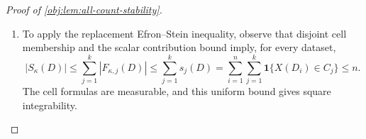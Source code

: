\begin{proof}[Proof of \cref{obj:lem:all-count-stability}]
\begin{enumerate}
The original and replacement datasets have the same erased cell tuples. Applying the preceding estimate to both gives
\[
\begin{aligned}
|F_{\kappa,j}(D)-F_{\kappa,j}(D^{(i_\star)})|
\le{}&
3\,\mathbf1\{X(D_{i_\star})\in C_j,\ B_{j,i_\star}(D)\ge1\}\\
&+3\,\mathbf1\{X(o^\star)\in C_j,\ B_{j,i_\star}(D)\ge1\}.
\end{aligned}
\]
Summing over cells and using the partner-indicator identity therefore yields
\[
|S_\kappa(D)-S_\kappa(D^{(i_\star)})|
\le3\bigl(J_{i_\star}^{\mathrm{old}}+J_{i_\star}^{\mathrm{new}}\bigr).
\]
Both indicators take values in \(\{0,1\}\). Squaring this bound and checking their four possible pairs gives
\[
\begin{aligned}
\bigl(S_\kappa(D)-S_\kappa(D^{(i_\star)})\bigr)^2
&\le9\bigl(J_{i_\star}^{\mathrm{old}}+J_{i_\star}^{\mathrm{new}}\bigr)^2\\
&\le18\bigl(J_{i_\star}^{\mathrm{old}}+J_{i_\star}^{\mathrm{new}}\bigr).
\end{aligned}
\]
For the pairs \((0,0),(1,0),(0,1),(1,1)\), the middle expression is respectively \(0,9,9,36\), while the final expression is \(0,18,18,36\).

The bounded measurable statistics and indicators make these expressions integrable. Taking expectations and applying the partner expectation from the preceding step gives, for every record position,
\[
\begin{aligned}
\mathbb E\bigl(S_N(D)-S_N(D^{(i_\star)})\bigr)^2
&\le18\,\mathbb E\bigl[J_{i_\star}^{\mathrm{old}}
+J_{i_\star}^{\mathrm{new}}\bigr]
=\frac{36W(P)}n,\\
\mathbb E\bigl(S_D(D)-S_D(D^{(i_\star)})\bigr)^2
&\le18\,\mathbb E\bigl[J_{i_\star}^{\mathrm{old}}
+J_{i_\star}^{\mathrm{new}}\bigr]
=\frac{36W(P)}n.
\end{aligned}
\]

\item To apply the replacement Efron--Stein inequality, observe that disjoint cell membership and the scalar contribution bound imply, for every dataset,
\[
|S_\kappa(D)|
\le\sum_{j=1}^k|F_{\kappa,j}(D)|
\le\sum_{j=1}^k s_j(D)
=\sum_{i=1}^n\sum_{j=1}^k\mathbf1\{X(D_i)\in C_j\}
\le n.
\]
The cell formulas are measurable, and this uniform bound gives square integrability.


\end{enumerate}
\end{proof}
